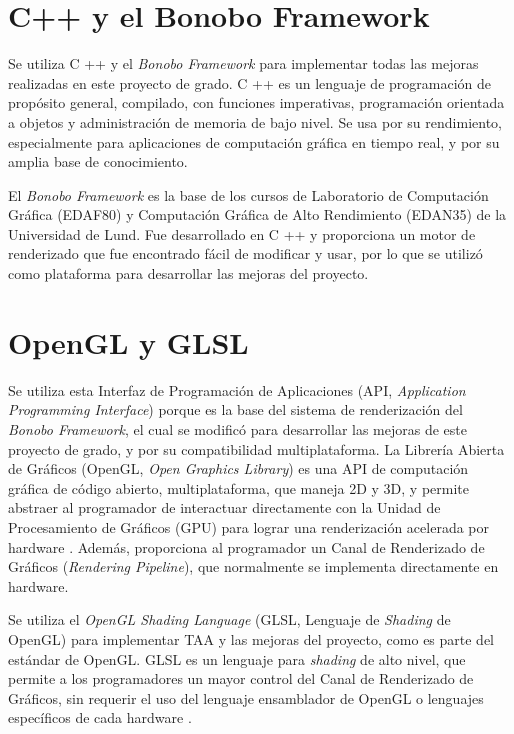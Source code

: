 \documentclass[pregrado]{tesis-usb} %
\begin{document}
\section{C++ y el Bonobo Framework}
Se utiliza C ++ y el \textit{Bonobo Framework} para implementar todas las mejoras realizadas en este proyecto de grado. C ++ es un lenguaje de programación de propósito general, compilado, con funciones imperativas, programación orientada a objetos y administración de memoria de bajo nivel. Se usa por su rendimiento, especialmente para aplicaciones de computación gráfica en tiempo real, y por su amplia base de conocimiento.

El \textit{Bonobo Framework} es la base de los cursos de Laboratorio de Computación Gráfica (EDAF80) y Computación Gráfica de Alto Rendimiento (EDAN35) de la Universidad de Lund. Fue desarrollado en C ++ y proporciona un motor de renderizado que fue encontrado fácil de modificar y usar, por lo que se utilizó como plataforma para desarrollar las mejoras del proyecto.


\section{OpenGL y GLSL}
Se utiliza esta Interfaz de Programación de Aplicaciones (API, \textit{Application Programming Interface}) porque es la base del sistema de renderización del \textit{Bonobo Framework}, el cual se modificó para desarrollar las mejoras de este proyecto de grado, y por su compatibilidad multiplataforma. La Librería Abierta de Gráficos (OpenGL, \textit{Open Graphics Library}) es una API de computación gráfica de código abierto, multiplataforma, que maneja 2D y 3D, y permite abstraer al programador de interactuar directamente con la Unidad de Procesamiento de Gráficos (GPU) para lograr una renderización acelerada por hardware \cite{Doggett2017EDAF80}. Además, proporciona al programador un Canal de Renderizado de Gráficos (\textit{Rendering Pipeline}), que normalmente se implementa directamente en hardware.

Se utiliza el \textit{OpenGL Shading Language} (GLSL, Lenguaje de \textit{Shading} de OpenGL) para implementar TAA y las mejoras del proyecto, como es parte del estándar de OpenGL. GLSL es un lenguaje para \textit{shading} de alto nivel, que permite a los programadores un mayor control del Canal de Renderizado de Gráficos, sin requerir el uso del lenguaje ensamblador de OpenGL o lenguajes específicos de cada hardware \cite{Doggett2017EDAF80}.
\end{document}
